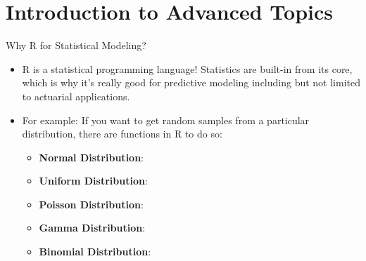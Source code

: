 \section{Introduction to Advanced Topics}

\sectionframe

\begin{frame}{Why R for Statistical Modeling?}
\begin{itemize}
  \item R is a statistical programming language! Statistics are built-in from its core, which is why it’s really good for predictive modeling including but not limited to actuarial applications.
  \item For example: If you want to get random samples from a particular distribution, there are functions in R to do so:
  \begin{itemize}
    \item \textbf{Normal Distribution}: 
    \item \textbf{Uniform Distribution}: 
    \item \textbf{Poisson Distribution}: 
    \item \textbf{Gamma Distribution}: 
    \item \textbf{Binomial Distribution}: 
  \end{itemize}
\end{itemize}
\end{frame}

